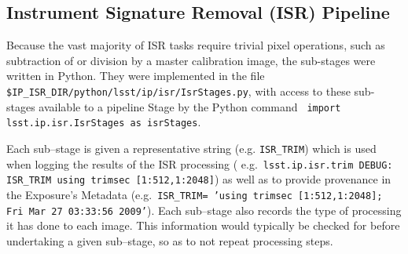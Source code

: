 
\subsection{Instrument Signature Removal (ISR) Pipeline}
\label{sec:isr}

Because the vast majority of ISR tasks require trivial pixel
operations, such as subtraction of or division by a master calibration
image, the sub-stages were written in Python. They were implemented in
the file {\tt \$IP\_ISR\_DIR/python/lsst/ip/isr/IsrStages.py}, with
access to these sub-stages available to a pipeline Stage by the
Python command {\tt
import lsst.ip.isr.IsrStages as isrStages}.

Each sub--stage is given a representative string (e.g. \texttt{ISR\_TRIM})
%
which is used when logging the results of the ISR processing (%
e.g.~\texttt{lsst.ip.isr.trim DEBUG: ISR\_TRIM using trimsec
[1:512,1:2048]})
%
as well as to provide provenance in the Exposure's Metadata 
%
(e.g.~\texttt{ISR\_TRIM= 'using trimsec [1:512,1:2048]; Fri Mar 27
03:33:56 2009'}).
%
Each sub--stage also records the type of
processing it has done to each image.  This information would typically be
checked for before undertaking a given sub--stage, so as to not repeat
processing steps.

